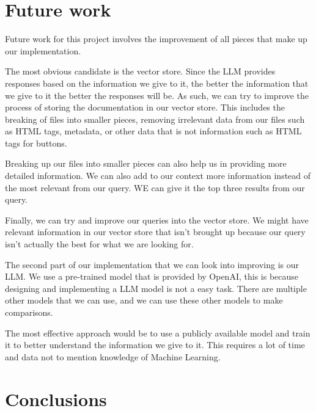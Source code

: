 \section{Future work}
\label{sec:FW}

Future work for this project involves the improvement of all pieces that make
up our implementation.

The most obvious candidate is the vector store. Since the LLM provides
responses based on the information we give to it, the better the information
that we give to it the better the responses will be. As such, we can try to
improve the process of storing the documentation in our vector store. This
includes the breaking of files into smaller pieces, removing irrelevant data
from our files such as HTML tags, metadata, or other data that is not
information such as HTML tags for buttons.

Breaking up our files into smaller pieces can also help us in providing more
detailed information. We can also add to our context more information instead
of the most relevant from our query. WE can give it the top three results from
our query.

Finally, we can try and improve our queries into the vector store. We might
have relevant information in our vector store that isn’t brought up because our
query isn’t actually the best for what we are looking for.

The second part of our implementation that we can look into improving is our
LLM. We use a pre-trained model that is provided by OpenAI, this is because
designing and implementing a LLM model is not a easy task. There are multiple
other models that we can use, and we can use these other models to make
comparisons.

The most effective approach would be to use a publicly available model and
train it to better understand the information we give to it. This requires a
lot of time and data not to mention knowledge of Machine Learning.

\section{Conclusions}
\label{sec:conclusions}
